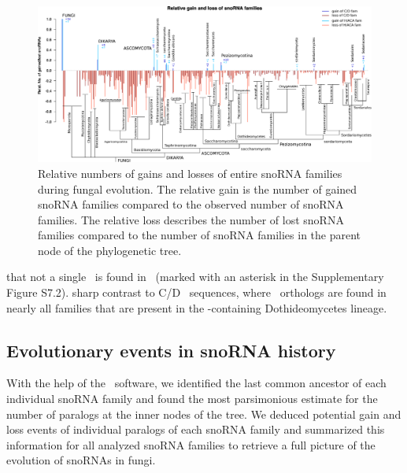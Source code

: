 \begin{figure}
  \centering
  \includegraphics[width=\textwidth]{pics/fungi_relative_gain_loss_PAPERVERSION.eps}
  \caption{Relative numbers of gains and losses of entire snoRNA families
    during fungal evolution. The relative gain is the number of gained
    snoRNA families compared to the observed number of snoRNA families. The
    relative loss describes the number of lost snoRNA families compared to
    the number of snoRNA families in the parent node of the phylogenetic
    tree.}
\label{fig:relative_innovation_deletion_event}
\end{figure}

 that not a single \haca\ is found in \Ptt\ (marked with an
asterisk in the Supplementary Figure S7.2). 
sharp contrast to C/D \sno\ sequences, where \ptt\ orthologs are found in
nearly all families that are present in the \ptt-containing Dothideomycetes
lineage.

\subsection{Evolutionary events in snoRNA history}

With the help of the \epope\ software, we identified the last common
ancestor of each individual snoRNA family and found the most parsimonious
estimate for the number of paralogs at the inner nodes of the tree.  We
deduced potential gain and loss events of individual paralogs of each
snoRNA family and summarized this information for all analyzed snoRNA
families to retrieve a full picture of the evolution of snoRNAs in fungi.

